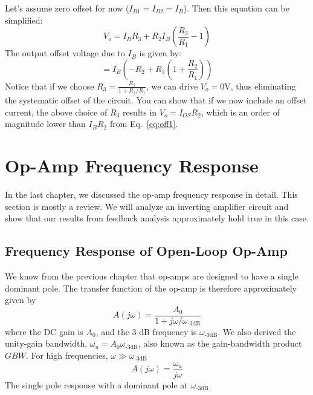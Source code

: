 \noindent Let's assume zero offset for now ($I_{B1} = I_{B2} = I_B$).  Then this equation can be simplified:
\begin{equation}
      V_o = I_{B} R_3 + R_2 I_B \left( \frac{R_3}{R_1} - 1 \right)
\end{equation}
The output offset voltage due to $I_B$ is given by:
\begin{equation}
       = I_{B}  \left( -R_2 + R_3\left(1+ \frac{R_2}{R_1}  \right)  \right)
\end{equation}
Notice that if we choose $R_3 = \frac{R_2}{1 + R_2/R_1}$, we can drive $V_o = 0$V, thus eliminating the systematic offset of the circuit.  You can show that if we now include an offset current, the above choice of $R_3$ results in $V_o = I_{OS} R_2 $, which is an order of magnitude lower than $I_B R_2$ from Eq.~\ref{eq:off1}.
\section{Op-Amp Frequency Response}
In the last chapter, we discussed the op-amp frequency response in detail. This section is mostly a review.  We will analyze an inverting amplifier circuit and show that our results from feedback analysis approximately hold true in this case.
\subsection{Frequency Response of Open-Loop Op-Amp}
We know from the previous chapter that op-amps are designed to have a single dominant pole.  The transfer function of the op-amp is therefore approximately given by
\begin{equation} 
	A(j\omega) = \frac{A_0}{1 + j\omega/\omega_\text{-3dB}} 
\end{equation}
where the DC gain is $A_0$, and the 3-dB frequency is $\omega_{\text{-3dB}}$.  We also derived the unity-gain bandwidth, $\omega_u = A_0 \omega_{\text{-3dB}}$, also known as the  gain-bandwidth product $GBW$.  For high frequencies, $\omega \gg \omega_{\text{-3dB}}$
\begin{equation}
  A(j\omega) = \frac{\omega_u}{j\omega}
\end{equation}
The single pole response with a dominant pole at $\omega_{\text{-3dB}}$.

